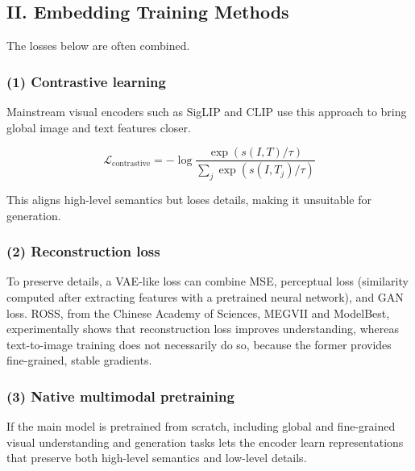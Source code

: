 \hypertarget{ii.-embedding-training-methods}{%
\subsection{II. Embedding Training Methods}\label{ii.-embedding-training-methods}}

The losses below are often combined.

\hypertarget{contrastive-learning-1}{%
\subsubsection{(1) Contrastive learning}\label{contrastive-learning-1}}

Mainstream visual encoders such as SigLIP and CLIP use this approach to bring global image and text features closer.

\[
\mathcal{L}_{\mathrm{contrastive}}
=-\log\frac{\exp(s(I,T)/\tau)}
{\sum_j\exp(s(I,T_j)/\tau)}
\]

This aligns high-level semantics but loses details, making it unsuitable for generation.

\hypertarget{reconstruction-loss}{%
\subsubsection{(2) Reconstruction loss}\label{reconstruction-loss}}

To preserve details, a VAE-like loss can combine MSE, perceptual loss (similarity computed after extracting features with a pretrained neural network), and GAN loss. ROSS, from the Chinese Academy of Sciences, MEGVII and ModelBest, experimentally shows that reconstruction loss improves understanding, whereas text-to-image training does not necessarily do so, because the former provides fine-grained, stable gradients.

\hypertarget{native-multimodal-pretraining}{%
\subsubsection{(3) Native multimodal pretraining}\label{native-multimodal-pretraining}}

If the main model is pretrained from scratch, including global and fine-grained visual understanding and generation tasks lets the encoder learn representations that preserve both high-level semantics and low-level details.

